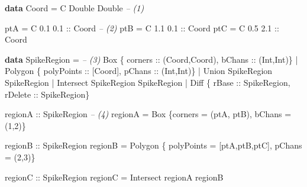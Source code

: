 \documentclass[]{article}
\newenvironment{Shaded}{}{}
\newcommand{\KeywordTok}[1]{\textcolor[rgb]{0.00,0.44,0.13}{\textbf{{#1}}}}
\newcommand{\DataTypeTok}[1]{\textcolor[rgb]{0.56,0.13,0.00}{{#1}}}
\newcommand{\DecValTok}[1]{\textcolor[rgb]{0.25,0.63,0.44}{{#1}}}
\newcommand{\FloatTok}[1]{\textcolor[rgb]{0.25,0.63,0.44}{{#1}}}
\newcommand{\CommentTok}[1]{\textcolor[rgb]{0.38,0.63,0.69}{\textit{{#1}}}}
\newcommand{\OtherTok}[1]{\textcolor[rgb]{0.00,0.44,0.13}{{#1}}}
\newcommand{\FunctionTok}[1]{\textcolor[rgb]{0.02,0.16,0.49}{{#1}}}
\newcommand{\NormalTok}[1]{{#1}}
\begin{document}
\singlespacing

\begin{Shaded}
\begin{Highlighting}[]
  \KeywordTok{data} \DataTypeTok{Coord} \FunctionTok{=} \DataTypeTok{C} \DataTypeTok{Double} \DataTypeTok{Double}  \CommentTok{-- (1)}

  \NormalTok{ptA }\FunctionTok{=} \DataTypeTok{C} \FloatTok{0.1} \FloatTok{0.1}\OtherTok{ ::} \DataTypeTok{Coord}      \CommentTok{-- (2)}
  \NormalTok{ptB }\FunctionTok{=} \DataTypeTok{C} \FloatTok{1.1} \FloatTok{0.1}\OtherTok{ ::} \DataTypeTok{Coord}
  \NormalTok{ptC }\FunctionTok{=} \DataTypeTok{C} \FloatTok{0.5} \FloatTok{2.1}\OtherTok{ ::} \DataTypeTok{Coord}

  \KeywordTok{data} \DataTypeTok{SpikeRegion} \FunctionTok{=}            \CommentTok{-- (3)}
      \DataTypeTok{Box}       \NormalTok{\{}\OtherTok{ corners ::} \NormalTok{(}\DataTypeTok{Coord}\NormalTok{,}\DataTypeTok{Coord}\NormalTok{),}\OtherTok{ bChans ::} \NormalTok{(}\DataTypeTok{Int}\NormalTok{,}\DataTypeTok{Int}\NormalTok{)\}}
    \FunctionTok{|} \DataTypeTok{Polygon}   \NormalTok{\{}\OtherTok{ polyPoints ::} \NormalTok{[}\DataTypeTok{Coord}\NormalTok{],}\OtherTok{    pChans ::} \NormalTok{(}\DataTypeTok{Int}\NormalTok{,}\DataTypeTok{Int}\NormalTok{)\}      }
    \FunctionTok{|} \DataTypeTok{Union}     \DataTypeTok{SpikeRegion} \DataTypeTok{SpikeRegion}
    \FunctionTok{|} \DataTypeTok{Intersect} \DataTypeTok{SpikeRegion} \DataTypeTok{SpikeRegion}
    \FunctionTok{|} \DataTypeTok{Diff}      \NormalTok{\{}\OtherTok{ rBase ::} \DataTypeTok{SpikeRegion}\NormalTok{,}\OtherTok{ rDelete ::} \DataTypeTok{SpikeRegion}\NormalTok{\}}

\OtherTok{regionA ::} \DataTypeTok{SpikeRegion}          \CommentTok{-- (4)}
\NormalTok{regionA }\FunctionTok{=} \DataTypeTok{Box} \NormalTok{\{corners }\FunctionTok{=} \NormalTok{(ptA, ptB), bChans }\FunctionTok{=} \NormalTok{(}\DecValTok{1}\NormalTok{,}\DecValTok{2}\NormalTok{)\}}

\OtherTok{regionB ::} \DataTypeTok{SpikeRegion}
\NormalTok{regionB }\FunctionTok{=} \DataTypeTok{Polygon} \NormalTok{\{ polyPoints }\FunctionTok{=} \NormalTok{[ptA,ptB,ptC], pChans }\FunctionTok{=} \NormalTok{(}\DecValTok{2}\NormalTok{,}\DecValTok{3}\NormalTok{)\}}

\OtherTok{regionC ::} \DataTypeTok{SpikeRegion}
\NormalTok{regionC }\FunctionTok{=} \DataTypeTok{Intersect} \NormalTok{regionA regionB}
\end{Highlighting}
\end{Shaded}
\end{document}
